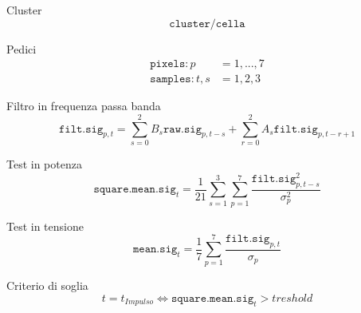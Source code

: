 \documentclass[10pt,a4paper]{article}
\begin{document}
Cluster
\begin{equation}
\mathtt{cluster / cella}
\end{equation}

Pedici
\begin{align}
\mathtt{pixels: }  p   & = 1, ..., 7 \\
\mathtt{samples: } t,s & = 1, 2, 3
\end{align}

Filtro in frequenza passa banda
\begin{equation}
\mathtt{filt.sig}_{p,t} = \sum_{s=0}^{2} B_{s}\mathtt{raw.sig}_{p,t-s} + \sum_{r=0}^{2} A_{s}\mathtt{filt.sig}_{p,t-r+1} 
\end{equation}

Test in potenza
\begin{equation}
\mathtt{square.mean.sig}_{t} = \frac{1}{21} \sum_{s=1}^{3} \sum_{p=1}^{7} \frac{\mathtt{filt.sig}_{p,t-s}^{2}}{\sigma^{2}_{p}} 
\end{equation}

Test in tensione
\begin{equation}
\mathtt{mean.sig}_{t} = \frac{1}{7} \sum_{p=1}^{7} \frac{\mathtt{filt.sig}_{p,t}}{\sigma_{p}} 
\end{equation}

Criterio di soglia
\begin{equation}
t = t_{Impulso} \Leftrightarrow \mathtt{square.mean.sig}_{t} > treshold
\end{equation}
\end{document}
